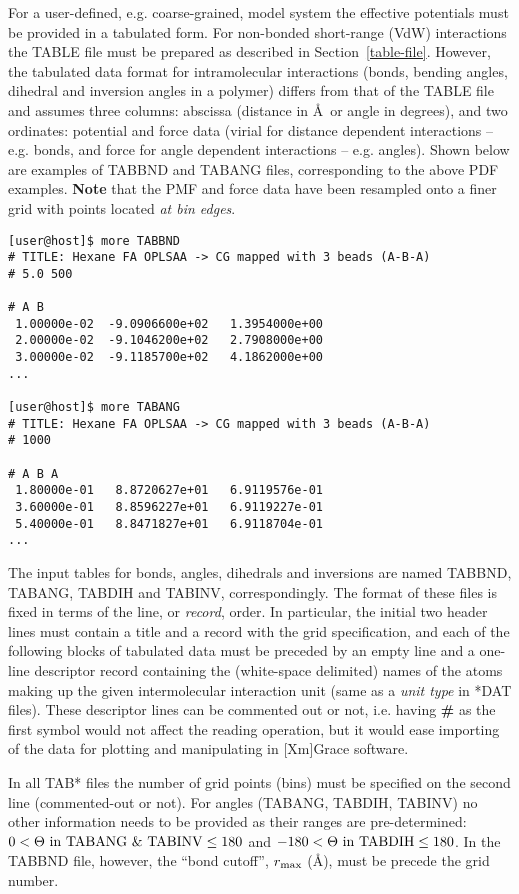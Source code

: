 For a user-defined, e.g. coarse-grained, model system
the effective potentials must be provided in a tabulated form.
For non-bonded short-range (VdW) interactions the TABLE file
must be prepared as described in Section~\ref{table-file}.
However, the tabulated data format for intramolecular
interactions (bonds, bending angles, dihedral and inversion
angles in a polymer) differs from that of the TABLE file and
assumes three columns: abscissa (distance in \AA~or angle
in degrees), and two ordinates: potential and force data
(virial for distance dependent interactions -- e.g. bonds,
and force for angle dependent interactions -- e.g. angles).
Shown below are examples of TABBND and TABANG files,
corresponding to the above PDF examples. {\bf Note} that
the PMF and force data have been resampled onto a finer grid
with points located {\em at bin edges}.

\begin{lstlisting}
[user@host]$ more TABBND
# TITLE: Hexane FA OPLSAA -> CG mapped with 3 beads (A-B-A)
# 5.0 500

# A B
 1.00000e-02  -9.0906600e+02   1.3954000e+00
 2.00000e-02  -9.1046200e+02   2.7908000e+00
 3.00000e-02  -9.1185700e+02   4.1862000e+00
...

[user@host]$ more TABANG
# TITLE: Hexane FA OPLSAA -> CG mapped with 3 beads (A-B-A)
# 1000

# A B A
 1.80000e-01   8.8720627e+01   6.9119576e-01
 3.60000e-01   8.8596227e+01   6.9119227e-01
 5.40000e-01   8.8471827e+01   6.9118704e-01
...
\end{lstlisting}

The input tables for bonds, angles, dihedrals and inversions are
named TABBND, TABANG, TABDIH and TABINV, correspondingly.
The format of these files is fixed in terms of the line,
or {\em record}, order.  In particular, the initial two
header lines must contain a title and a record with the grid
specification, and each of the following blocks of tabulated
data must be preceded by an empty line and a one-line
descriptor record containing the (white-space delimited) names
of the atoms making up the given intermolecular interaction
unit (same as a {\em unit type} in *DAT files).  These descriptor
lines can be commented out or not, i.e. having {\bf \#} as the
first symbol would not affect the reading operation, but it would
ease importing of the data for plotting and manipulating
in [Xm]Grace software.

In all TAB* files the number of grid points (bins) must be
specified on the second line (commented-out or not).  For
angles (TABANG, TABDIH, TABINV) no other information needs
to be provided as their ranges are pre-determined:
$0 < {\Theta\ \rm in\ TABANG\ \&\ TABINV} \le 180$
and  $-180 < {\Theta\ \rm in\ TABDIH} \le 180$. In the TABBND
file, however, the ``bond cutoff'', $r_{\rm max}$ (\AA),
must be precede the grid number.

